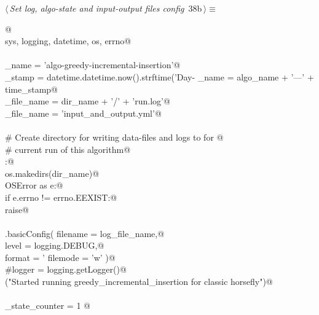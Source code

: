 \documentclass[11.5pt]{report}
\begin{document}
\begin{flushleft} \small\label{scrap48}\raggedright\small
{} $\langle\,${\itshape Set log, algo-state and input-output files config}\nobreak\ {\footnotesize {38b}}$\,\rangle\equiv$
\vspace{-1ex}
\begin{list}{}{} \item
\mbox{}\verb@  @\\
\mbox{}\verb@import sys, logging, datetime, os, errno@\\
\mbox{}\verb@@\\
\mbox{}\verb@algo_name     = 'algo-greedy-incremental-insertion'@\\
\mbox{}\verb@time_stamp    = datetime.datetime.now().strftime('Day-%Y-%m-%d_ClockTime-%H:%M:%S')@\\
\mbox{}\verb@dir_name      = algo_name + '---' + time_stamp@\\
\mbox{}\verb@log_file_name = dir_name + '/' + 'run.log'@\\
\mbox{}\verb@io_file_name  = 'input_and_output.yml'@\\
\mbox{}\verb@@\\
\mbox{}\verb@# Create directory for writing data-files and logs to for @\\
\mbox{}\verb@# current run of this algorithm@\\
\mbox{}\verb@try:@\\
\mbox{}\verb@    os.makedirs(dir_name)@\\
\mbox{}\verb@except OSError as e:@\\
\mbox{}\verb@    if e.errno != errno.EEXIST:@\\
\mbox{}\verb@        raise@\\
\mbox{}\verb@@\\
\mbox{}\verb@logging.basicConfig( filename = log_file_name,@\\
\mbox{}\verb@                     level    = logging.DEBUG,@\\
\mbox{}\verb@                     format   = '%(asctime)s: %(levelname)s: %(message)s',@\\
\mbox{}\verb@                     filemode = 'w' )@\\
\mbox{}\verb@#logger = logging.getLogger()@\\
\mbox{}\verb@info("Started running greedy_incremental_insertion for classic horsefly")@\\
\mbox{}\verb@@\\
\mbox{}\verb@algo_state_counter = 1 @\\

\end{list}
\end{flushleft}
\end{document}
